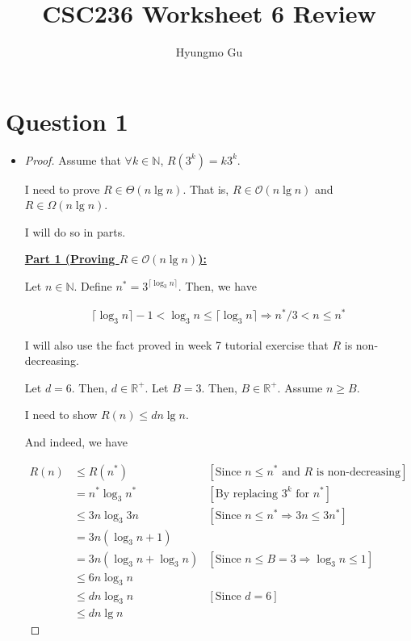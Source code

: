 \documentclass[12pt]{article}
\begin{document}
\title{CSC236 Worksheet 6 Review}
\author{Hyungmo Gu}
\maketitle

\section*{Question 1}
\begin{itemize}
    \item

    \begin{proof}

    Assume that $\forall k \in \mathbb{N}$, $R(3^k)=k3^k$.

    \bigskip

    I need to prove $R \in \Theta(n \lg n)$. That is, $R \in \mathcal{O}(n \lg n)$
    and $R \in \Omega(n \lg n)$.

    \bigskip

    I will do so in parts.

    \bigskip

    \underline{\textbf{Part 1 (Proving $R \in \mathcal{O}(n \lg n)$):}}

    \bigskip

    Let $n \in \mathbb{N}$. Define $n^* = 3^{\lceil \log_3 n \rceil}$.
    Then, we have

    \begin{align}
        \lceil \log_3 n \rceil - 1 < \log_3 n \leq \lceil \log_3 n \rceil \Rightarrow n^*/3 < n \leq n^*
    \end{align}

    \bigskip

    I will also use the fact proved in week 7 tutorial exercise that
    $R$ is non-decreasing.

    \bigskip

    Let $d = 6$. Then, $d \in \mathbb{R}^+$. Let $B = 3$. Then, $B \in \mathbb{R}^+$.
    Assume $n \geq B$.

    \bigskip

    I need to show $R(n) \leq dn\lg n$.

    \bigskip

    And indeed, we have

    \begin{align}
        R(n) &\leq R(n^*) & [\text{Since $n \leq n^*$ and $R$ is non-decreasing}]\\
        &= n^* \log_3 n^* & [\text{By replacing $3^k$ for $n^*$}]\\
        &\leq 3n \log_3 3n & [\text{Since $n \leq n^* \Rightarrow 3n \leq 3n^*$}]\\
        &= 3n(\log_3 n + 1)\\
        &= 3n(\log_3 n + \log_3 n) & [\text{Since $n \leq B = 3 \Rightarrow \log_3 n \leq 1$}]\\
        &\leq 6n\log_3 n\\
        &\leq dn\log_3 n & [\text{Since $d = 6$}]\\
        &\leq dn\lg n
    \end{align}


\end{proof}
\end{itemize}
\end{document}
